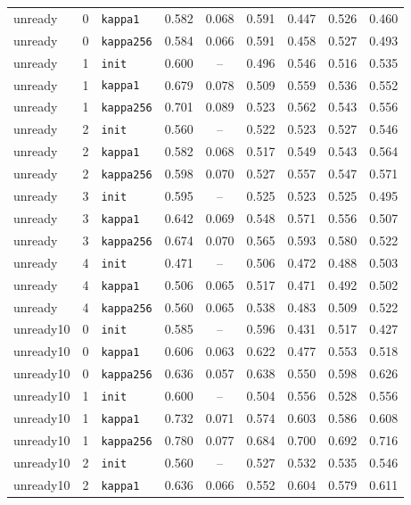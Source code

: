 \begin{table}[htbp]
{\begin{tabular}{lllcccccc}
unready & 0 & \texttt{kappa1} & 0.582 & 0.068 & 0.591 & 0.447 & 0.526 & 0.460 \\
unready & 0 & \texttt{kappa256} & 0.584 & 0.066 & 0.591 & 0.458 & 0.527 & 0.493 \\
unready & 1 & \texttt{init} & 0.600 & -- & 0.496 & 0.546 & 0.516 & 0.535 \\
unready & 1 & \texttt{kappa1} & 0.679 & 0.078 & 0.509 & 0.559 & 0.536 & 0.552 \\
unready & 1 & \texttt{kappa256} & 0.701 & 0.089 & 0.523 & 0.562 & 0.543 & 0.556 \\
unready & 2 & \texttt{init} & 0.560 & -- & 0.522 & 0.523 & 0.527 & 0.546 \\
unready & 2 & \texttt{kappa1} & 0.582 & 0.068 & 0.517 & 0.549 & 0.543 & 0.564 \\
unready & 2 & \texttt{kappa256} & 0.598 & 0.070 & 0.527 & 0.557 & 0.547 & 0.571 \\
unready & 3 & \texttt{init} & 0.595 & -- & 0.525 & 0.523 & 0.525 & 0.495 \\
unready & 3 & \texttt{kappa1} & 0.642 & 0.069 & 0.548 & 0.571 & 0.556 & 0.507 \\
unready & 3 & \texttt{kappa256} & 0.674 & 0.070 & 0.565 & 0.593 & 0.580 & 0.522 \\
unready & 4 & \texttt{init} & 0.471 & -- & 0.506 & 0.472 & 0.488 & 0.503 \\
unready & 4 & \texttt{kappa1} & 0.506 & 0.065 & 0.517 & 0.471 & 0.492 & 0.502 \\
unready & 4 & \texttt{kappa256} & 0.560 & 0.065 & 0.538 & 0.483 & 0.509 & 0.522 \\
unready10 & 0 & \texttt{init} & 0.585 & -- & 0.596 & 0.431 & 0.517 & 0.427 \\
unready10 & 0 & \texttt{kappa1} & 0.606 & 0.063 & 0.622 & 0.477 & 0.553 & 0.518 \\
unready10 & 0 & \texttt{kappa256} & 0.636 & 0.057 & 0.638 & 0.550 & 0.598 & 0.626 \\
unready10 & 1 & \texttt{init} & 0.600 & -- & 0.504 & 0.556 & 0.528 & 0.556 \\
unready10 & 1 & \texttt{kappa1} & 0.732 & 0.071 & 0.574 & 0.603 & 0.586 & 0.608 \\
unready10 & 1 & \texttt{kappa256} & 0.780 & 0.077 & 0.684 & 0.700 & 0.692 & 0.716 \\
unready10 & 2 & \texttt{init} & 0.560 & -- & 0.527 & 0.532 & 0.535 & 0.546 \\
unready10 & 2 & \texttt{kappa1} & 0.636 & 0.066 & 0.552 & 0.604 & 0.579 & 0.611 \\

\end{tabular}}
\end{table}
